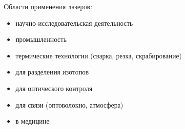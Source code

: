 Области применения лазеров:
\begin{itemize}
    \item научно-исследовательская деятельность
    \item промышленность
    \item термические технологии (сварка, резка, скрабирование)
    \item для разделения изотопов
    \item для оптического контроля
    \item для связи (оптоволокно, атмосфера)
    \item в медицине
\end{itemize}

